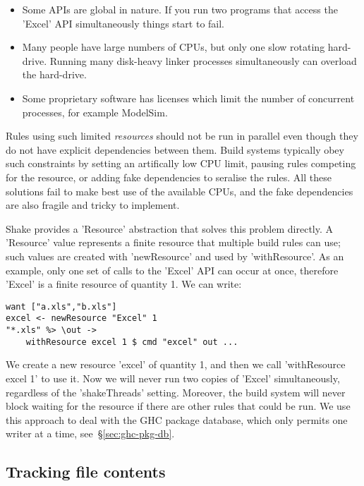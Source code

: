 \begin{itemize}
\item Some APIs are global in nature. If you run two programs that access the
\lst'Excel' API simultaneously things start to fail.
\item Many people have large numbers of CPUs, but only one slow rotating
hard-drive. Running many disk-heavy linker processes simultaneously can overload
the hard-drive.
\item Some proprietary software has licenses which limit the number of
concurrent processes, for example ModelSim.
\end{itemize}

\noindent Rules using such limited \emph{resources} should not be run in
parallel even though they do not have explicit dependencies between them. Build systems
typically obey such constraints by setting an artifically low CPU limit, pausing rules
competing for the resource, or adding fake dependencies to seralise the rules.
All these solutions fail to make best use of the available CPUs, and the fake
dependencies are also fragile and tricky to implement.

Shake provides a \lst'Resource' abstraction that solves this problem directly.
A \lst'Resource' value represents a finite resource that multiple build rules can use;
such values are created with \lst'newResource' and used by \lst'withResource'. As an
example, only one set of calls to the \lst'Excel' API can occur at once, therefore
\lst'Excel' is a finite resource of quantity 1. We can write:

\begin{lstlisting}
want ["a.xls","b.xls"]
excel <- newResource "Excel" 1
"*.xls" %> \out ->
    withResource excel 1 $ cmd "excel" out ...
\end{lstlisting}

\noindent We create a new resource \lst'excel' of quantity 1, and then we call
\lst'withResource excel 1' to use it. Now we will never run two copies of
\lst'Excel' simultaneously, regardless of the \lst'shakeThreads' setting.
Moreover, the build system will never block waiting for the resource if there
are other rules that could be run. We use this approach to deal with the GHC
package database, which only permits one writer at a time,
see~\S\ref{sec:ghc-pkg-db}.

\subsection{Tracking file contents\label{sec:file-contents}}

